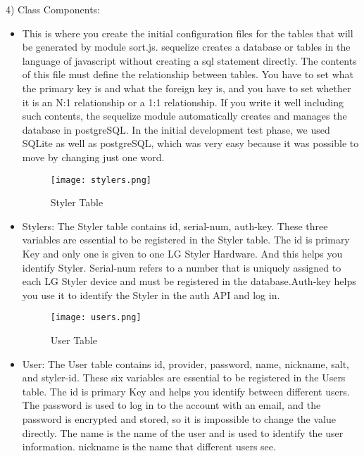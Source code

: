 \documentclass[conference]{IEEEtran}
\begin{document}
4) Class Components:
\begin{itemize}

    \item This is where you create the initial configuration files for the tables that will be generated by module sort.js. sequelize creates a database or tables in the language of javascript without creating a sql statement directly. The contents of this file must define the relationship between tables. You have to set what the primary key is and what the foreign key is, and you have to set whether it is an N:1 relationship or a 1:1 relationship. If you write it well including such contents, the sequelize module automatically creates and manages the database in postgreSQL. In the initial development test phase, we used SQLite as well as postgreSQL, which was very easy because it was possible to move by changing just one word.\\

    \begin{figure}[htbp]
    \centerline{\texttt{[image: stylers.png]}}
    \label{fig}
    \caption{Styler Table}
    \end{figure}
    \item Stylers: The Styler table contains id, serial-num, auth-key. These three variables are essential to be registered in the Styler table. The id is primary Key and only one is given to one LG Styler Hardware. And this helps you identify Styler. Serial-num refers to a number that is uniquely assigned to each LG Styler device and must be registered in the database.Auth-key helps you use it to identify the Styler in the auth API and log in.\\
    
    \begin{figure}[htbp]
    \centerline{\texttt{[image: users.png]}}
    \label{fig}
    \caption{User Table}
    \end{figure}
    \item User: The User table contains id, provider, password, name, nickname, salt, and styler-id. These six variables are essential to be registered in the Users table. The id is primary Key and helps you identify between different users. The password is used to log in to the account with an email, and the password is encrypted and stored, so it is impossible to change the value directly. The name is the name of the user and is used to identify the user information. nickname is the name that different users see.\\
    

\end{itemize}
\end{document}
